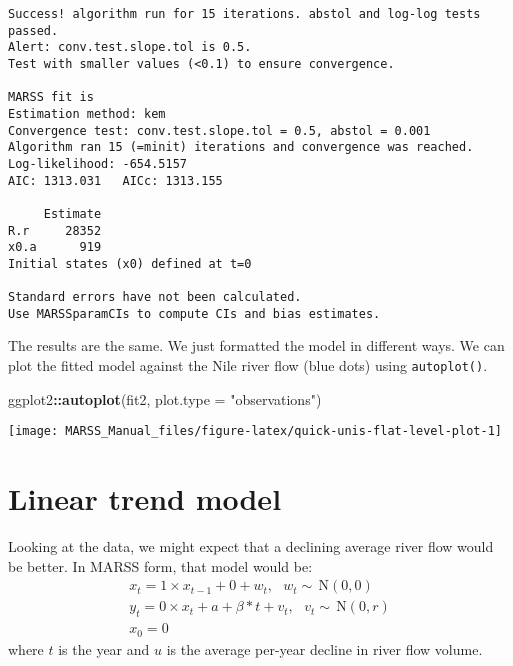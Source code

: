 \documentclass[12pt,]{book}
\newenvironment{Shaded}{\begin{snugshade}}{\end{snugshade}}
\newcommand{\DataTypeTok}[1]{\textcolor[rgb]{0.13,0.29,0.53}{#1}}
\newcommand{\KeywordTok}[1]{\textcolor[rgb]{0.13,0.29,0.53}{\textbf{#1}}}
\newcommand{\NormalTok}[1]{#1}
\newcommand{\OperatorTok}[1]{\textcolor[rgb]{0.81,0.36,0.00}{\textbf{#1}}}
\newcommand{\StringTok}[1]{\textcolor[rgb]{0.31,0.60,0.02}{#1}}
\begin{document}
\begin{verbatim}
Success! algorithm run for 15 iterations. abstol and log-log tests passed.
Alert: conv.test.slope.tol is 0.5.
Test with smaller values (<0.1) to ensure convergence.

MARSS fit is
Estimation method: kem 
Convergence test: conv.test.slope.tol = 0.5, abstol = 0.001
Algorithm ran 15 (=minit) iterations and convergence was reached. 
Log-likelihood: -654.5157 
AIC: 1313.031   AICc: 1313.155   
 
     Estimate
R.r     28352
x0.a      919
Initial states (x0) defined at t=0

Standard errors have not been calculated. 
Use MARSSparamCIs to compute CIs and bias estimates.
\end{verbatim}

The results are the same. We just formatted the model in different ways. We can plot the fitted model against the Nile river flow (blue dots) using \texttt{autoplot()}.

\begin{Shaded}
\begin{Highlighting}[]
\NormalTok{ggplot2}\OperatorTok{::}\KeywordTok{autoplot}\NormalTok{(fit2, }\DataTypeTok{plot.type =} \StringTok{"observations"}\NormalTok{)}
\end{Highlighting}
\end{Shaded}

\begin{center}\texttt{[image: MARSS\_Manual\_files/figure-latex/quick-unis-flat-level-plot-1]} \end{center}

\hypertarget{linear-trend-model}{%
\section{Linear trend model}\label{linear-trend-model}}

Looking at the data, we might expect that a declining average river flow would be better. In MARSS form, that model would be:
\begin{equation}
\begin{gathered}
x_t = 1 \times x_{t-1}+ 0 + w_t,    \text{ } w_t \sim \,\text{N}(0,0) \\
y_t = 0 \times x_t + a + \beta*t + v_t, \text{ } v_t \sim \,\text{N}(0,r)  \\
x_0 = 0 
\end{gathered}   
\label{eq:short-linear-level-model1}
\end{equation}
where \(t\) is the year and \(u\) is the average per-year decline in river flow volume.
\end{document}
